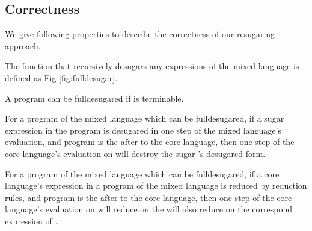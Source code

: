 \subsection{Correctness}
\label{mark:correct}

We give following properties to describe the correctness of our resugaring approach.
\begin{Def}[fulldesugar] The function that recursively desugars any expressions of the mixed language is defined as Fig \ref{fig:fulldesugar}.\end{Def}

A program  can be fulldesugared if  is terminable.



\begin{mythm} \label{thm1} For a program of the mixed language  which can be fulldesugared, if a sugar expression  in the program  is desugared in one step of the mixed language's evaluation, and program  is the  after  to the core language, then one step of the core language's evaluation on  will destroy the sugar 's desugared form.
\end{mythm}

\begin{mythm} \label{thm2} For a program of the mixed language  which can be fulldesugared, if a core language's expression  in a program  of the mixed language is reduced by reduction rules, and program  is the  after  to the core language, then one step of the core language's evaluation on  will reduce on the  will also reduce on the correspond expression of .
\end{mythm}

